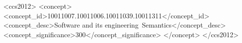\documentclass[acmlarge,review,anonymous]{acmart}\settopmatter{printfolios=true}
\begin{document}
\begin{CCSXML}
<ccs2012>
<concept>
<concept_id>10011007.10011006.10011039.10011311</concept_id>
<concept_desc>Software and its engineering~Semantics</concept_desc>
<concept_significance>300</concept_significance>
</concept>
</ccs2012>
\end{CCSXML}





\maketitle















\appendix
% 
\end{document}
